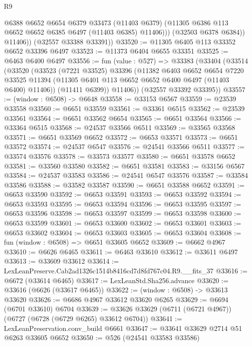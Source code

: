 \begin{lexlean}{R9}
\begin{coremodule}
                @6388
                @6652
                @6654
                @6379
                @33473
                (@11403 @6379)
                (@11305 @6386 @113 @6652 @6652 @6385 @6497 (@11403 @6385) @11406)))
            (@32503 @6378 @6384))
          @11406))
      (@32557 @33388 @33391))
@33520 := @11305 @6405 @113 @33352 @6652 @33396 @6497
@33523 := @11373 @6404 @6655 @33351
@33525 := @6463 @6400 @6497
@33556 := fun (value : @527) =>
  @33383
    (@33404
      (@33514
        (@33520
          (@33523
            (@7221 @33525)
            @33396
            (@11382
              @6403
              @6652
              @6654
              @7220
              @33525
              @11394
              (@11305 @6401 @113 @6652 @6652 @6400 @6497 (@11403 @6400) @11406))
            (@11411 @6399))
          @11406))
      (@32557 @33392 @33395))
@33557 := (window : @6508) -> @6648
@33558 := @33153 @6567
@33559 := @23539 @33558
@33560 := @6651 @33559
@33561 := @33361 @6515
@33562 := @23539 @33561
@33564 := @6651 @33562 @6654
@33565 := @6651 @33564
@33566 := @33364 @6515
@33568 := @24537 @33566 @6511
@33569 := @33565 @33568
@33571 := @6651 @33569 @6652
@33572 := @6653 @33571
@33573 := @6651 @33572
@33574 := @24537 @6547
@33576 := @24541 @33566 @6511
@33577 := @33574 @33576
@33578 := @33573 @33577
@33580 := @6651 @33578 @6652
@33581 := @33560 @33580
@33582 := @6651 @33581
@33583 := @33156 @6567
@33584 := @24537 @33583
@33586 := @24541 @6547 @33576
@33587 := @33584 @33586
@33588 := @33582 @33587
@33590 := @6651 @33588 @6652
@33591 := @6653 @33590
@33592 := @6653 @33591
@33593 := @6653 @33592
@33594 := @6653 @33593
@33595 := @6653 @33594
@33596 := @6653 @33595
@33597 := @6653 @33596
@33598 := @6653 @33597
@33599 := @6653 @33598
@33600 := @6653 @33599
@33601 := @6653 @33600
@33602 := @6653 @33601
@33603 := @6653 @33602
@33604 := @6653 @33603
@33605 := @6653 @33604
@33608 := fun (window : @6508) => @6651 @33605 @6652
@33609 := @6662 @4967
@33610 := @6626 @6465
@33611 := @6463 @33610
@33612 := @33611 @6497
@33613 := @33609 @33612
@33614 := LexLeanPreserve.Cab2ad1326c1514b8416cd7d8fd767c04.R9.__fits_37
@33616 := @6672 (@33614 @6465)
@33617 := LexLeanStd.Sha256.advance
@33620 := @33616 (@6626 (@33617 @6465))
@33622 := (window : @6508) -> @33613 @33620
@33626 := @6686 @4967 @33612 @33620 @6265
@33629 := @6694 (@6701 @33610) @6704
@33639 := @33626 @33629 (@6711 (@6721 @4967)) (@6727 (@6728 (@6729 @6265) @33612 @6704))
@33641 := LexLeanPreservation.conv_build @6661
@33647 := @33641 @33629 @2714 @51 @6263 @33605 @6652
@33650 := @526 (@24541 @33583 @33586)

\end{coremodule}
\end{lexlean}
